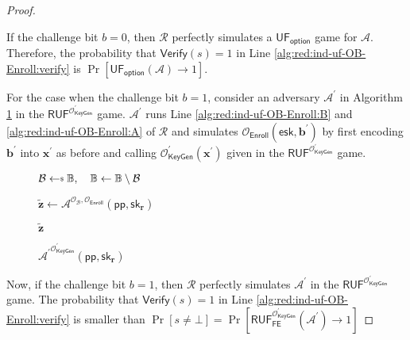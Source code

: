 \begin{proof}
\begin{figure}[h]
\end{figure}

	If the challenge bit $b = 0$, then $\mathcal{R}$ perfectly simulates a $\textsf{UF}_{\textsf{option}}$ game for $\mathcal{A}$. Therefore, the probability that $\textsf{Verify}(s) = 1$ in Line \ref{alg:red:ind-uf-OB-Enroll:verify} is $\Pr[\textsf{UF}_{\textsf{option}}(\mathcal{A}) \to 1]$.

	For the case when the challenge bit $b = 1$, consider an adversary $\mathcal{A}^\prime$ in Algorithm \ref{alg:adv:ind-uf-OB-Enroll} in the $\textsf{RUF}^{ \mathcal{O}^\prime_{\textsf{KeyGen}} }$ game. $\mathcal{A}^\prime$ runs Line \ref{alg:red:ind-uf-OB-Enroll:B} and \ref{alg:red:ind-uf-OB-Enroll:A} of $\mathcal{R}$ and simulates $\mathcal{O}_{\textsf{Enroll}}( \textsf{esk}, \mathbf{b}^\prime )$ by first encoding $\mathbf{b}^\prime$ into $\mathbf{x}^\prime$ as before and calling $\mathcal{O}_\textsf{KeyGen}^\prime(\mathbf{x}^\prime)$ given in the $\textsf{RUF}^{ \mathcal{O}^\prime_{\textsf{KeyGen}} }$ game. 


\begin{figure}[h]
\centering

	\begin{minipage}[t]{0.45\textwidth}
	\begin{algorithm}[H]
	\caption{${\mathcal{A}^\prime}^{\mathcal{O}^\prime_{\textsf{KeyGen}} }(\textsf{pp}, \textsf{sk}_\mathbf{r})$}
	\label{alg:adv:ind-uf-OB-Enroll}
	\begin{algorithmic}[1]
		\State $\mathcal{B} \getsdollar \mathbb{B}, \quad \mathbb{B} \gets \mathbb{B} \setminus \mathcal{B}$ 
		
		\State $\mathbf{\tilde{z}} \gets {\mathcal{A}}^{\mathcal{O}_{\mathcal{B}}, \mathcal{O}_\textsf{Enroll} } (\textsf{pp}, \textsf{sk}_{\mathbf{r}})$

		\State \Return $\mathbf{\tilde{z}}$
	\end{algorithmic}
	\end{algorithm}
	\end{minipage}

\end{figure}

Now, if the challenge bit $b = 1$, then $\mathcal{R}$ perfectly simulates $\mathcal{A}^\prime$ in the $\textsf{RUF}^{ \mathcal{O}^\prime_{\textsf{KeyGen}} }$ game. The probability that $\textsf{Verify}(s) = 1$ in Line \ref{alg:red:ind-uf-OB-Enroll:verify} is smaller than $\Pr[s \neq \bot] = \Pr[\textsf{RUF}^{\mathcal{O}^\prime_{\textsf{KeyGen}}}_{\textsf{FE}}(\mathcal{A}^\prime) \to 1 ]$


\end{proof}
